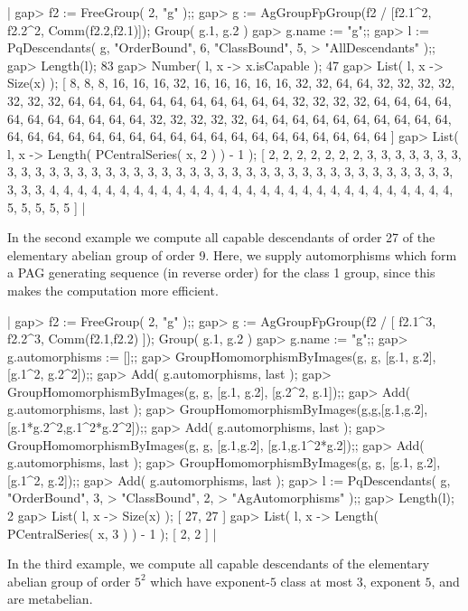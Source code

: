 |    gap> f2 := FreeGroup( 2, "g" );;
    gap> g := AgGroupFpGroup(f2 / [f2.1^2, f2.2^2, Comm(f2.2,f2.1)]);
    Group( g.1, g.2 )
    gap> g.name := "g";;
    gap> l := PqDescendants( g, "OrderBound", 6, "ClassBound", 5,
    >                        "AllDescendants" );;
    gap> Length(l);
    83
    gap> Number( l, x -> x.isCapable );
    47
    gap> List( l, x -> Size(x) );
    [ 8, 8, 8, 16, 16, 16, 32, 16, 16, 16, 16, 16, 32, 32, 64, 64, 32,
      32, 32, 32, 32, 32, 32, 64, 64, 64, 64, 64, 64, 64, 64, 64, 64, 64,
      32, 32, 32, 32, 64, 64, 64, 64, 64, 64, 64, 64, 64, 64, 64, 32, 32,
      32, 32, 32, 64, 64, 64, 64, 64, 64, 64, 64, 64, 64, 64, 64, 64, 64,
      64, 64, 64, 64, 64, 64, 64, 64, 64, 64, 64, 64, 64, 64, 64 ]
    gap> List( l, x -> Length( PCentralSeries( x, 2 ) ) - 1 );
    [ 2, 2, 2, 2, 2, 2, 2, 3, 3, 3, 3, 3, 3, 3, 3, 3, 3, 3, 3, 3, 3, 3,
      3, 3, 3, 3, 3, 3, 3, 3, 3, 3, 3, 3, 3, 3, 3, 3, 3, 3, 3, 3, 3, 3,
      3, 3, 3, 3, 3, 4, 4, 4, 4, 4, 4, 4, 4, 4, 4, 4, 4, 4, 4, 4, 4, 4,
      4, 4, 4, 4, 4, 4, 4, 4, 4, 4, 4, 4, 5, 5, 5, 5, 5 ] |

In the second example we compute all  capable descendants of order  27 of
the  elementary abelian group of order 9.  Here, we supply  automorphisms
which form a  PAG generating  sequence (in reverse order) for the class 1
group, since this  makes the computation more efficient.

|    gap> f2 := FreeGroup( 2, "g" );;
    gap> g := AgGroupFpGroup(f2 / [ f2.1^3, f2.2^3, Comm(f2.1,f2.2) ]);
    Group( g.1, g.2 )
    gap> g.name := "g";;
    gap> g.automorphisms := [];;
    gap> GroupHomomorphismByImages(g, g, [g.1, g.2], [g.1^2, g.2^2]);;
    gap> Add( g.automorphisms, last );
    gap> GroupHomomorphismByImages(g, g, [g.1, g.2], [g.2^2, g.1]);;
    gap> Add( g.automorphisms, last );
    gap> GroupHomomorphismByImages(g,g,[g.1,g.2],[g.1*g.2^2,g.1^2*g.2^2]);;
    gap> Add( g.automorphisms, last );
    gap> GroupHomomorphismByImages(g, g, [g.1,g.2], [g.1,g.1^2*g.2]);;
    gap> Add( g.automorphisms, last );
    gap> GroupHomomorphismByImages(g, g, [g.1, g.2], [g.1^2, g.2]);;
    gap> Add( g.automorphisms, last );
    gap> l := PqDescendants( g, "OrderBound", 3,
    >                           "ClassBound", 2,
    >                           "AgAutomorphisms" );;
    gap> Length(l);
    2
    gap> List( l, x -> Size(x) );
    [ 27, 27 ]
    gap> List( l, x -> Length( PCentralSeries( x, 3 ) ) - 1 );
    [ 2, 2 ] |

In  the  third  example,  we  compute  all  capable  descendants  of  the
elementary abelian group of order  $5^2$ which have exponent-$5$ class at
most $3$, exponent $5$, and are metabelian.

